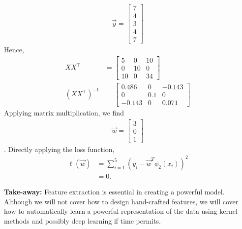 \documentclass[11pt]{article}
\begin{document}
\begin{enumerate}[(1)]
\begin{align*}
		\vec{y} = \begin{bmatrix}
		7 \\[0.3em]
		4 \\
		3 \\
		4 \\
		7
		\end{bmatrix}
		\end{align*}
		Hence,
		\begin{align*}
		XX^\top & = \begin{bmatrix}
		5 & 0 & 10 \\[0.3em]
		0 & 10 & 0 \\[0.3em]
		10 & 0 & 34
		\end{bmatrix} \\
		(XX^\top)^{-1} & = \begin{bmatrix}
		0.486 & 0 & -0.143 \\[0.3em]
		0 & 0.1 & 0        \\[0.3em]
		-0.143 & 0 & 0.071
		\end{bmatrix}
		\end{align*}
		Applying matrix multiplication, we find
		\begin{align*}
		\vec{w} = \begin{bmatrix}
		3 \\[0.3em]
		0 \\[0.3em]
		1
		\end{bmatrix}
		\end{align*}.
		Directly applying the loss function,
		\begin{align*}
		\ell(\vec{w}) & = \sum_{i = 1}^{5} (y_i - \vec{w}^T \phi_2(x_i))^2 \\
		& = 0.
		\end{align*}
	\end{enumerate}
	\textbf{Take-away:} Feature extraction is essential in creating a powerful model. Although we will not cover how to design hand-crafted features, we will cover how to automatically learn a powerful representation of the data using kernel methods and possibly deep learning if time permits.
\end{document}
